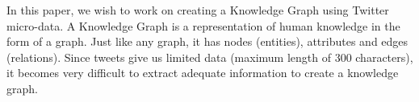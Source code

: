 
In this paper, we wish to work on creating a Knowledge Graph using Twitter micro-data.
A Knowledge Graph is a representation of human knowledge in the form of a graph. Just like any graph, 
it has nodes (entities), attributes and edges (relations). Since tweets give us limited data 
(maximum length of 300 characters), it becomes very difficult to extract adequate information to create 
a knowledge graph.





\endinput